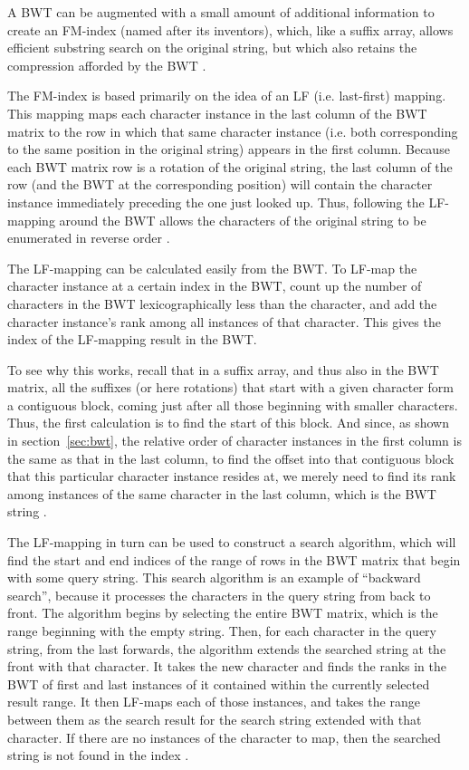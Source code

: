 \documentclass[11pt,proposal]{ucthesis}
\begin{document}

A BWT can be augmented with a small amount of additional information to create an FM-index (named after its inventors), which, like a suffix array, allows efficient substring search on the original string, but which also retains the compression afforded by the BWT \cite{ferragina2000opportunistic}.

The FM-index is based primarily on the idea of an LF (i.e. last-first) mapping. This mapping maps each character instance in the last column of the BWT matrix to the row in which that same character instance (i.e. both corresponding to the same position in the original string) appears in the first column. Because each BWT matrix row is a rotation of the original string, the last column of the row (and the BWT at the corresponding position) will contain the character instance immediately preceding the one just looked up. Thus, following the LF-mapping around the BWT allows the characters of the original string to be enumerated in reverse order \cite{ferragina2000opportunistic}.

The LF-mapping can be calculated easily from the BWT. To LF-map the character instance at a certain index in the BWT, count up the number of characters in the BWT lexicographically less than the character, and add the character instance's rank among all instances of that character. This gives the index of the LF-mapping result in the BWT.

To see why this works, recall that in a suffix array, and thus also in the BWT matrix, all the suffixes (or here rotations) that start with a given character form a contiguous block, coming just after all those beginning with smaller characters. Thus, the first calculation is to find the start of this block. And since, as shown in section~\ref{sec:bwt}, the relative order of character instances in the first column is the same as that in the last column, to find the offset into that contiguous block that this particular character instance resides at, we merely need to find its rank among instances of the same character in the last column, which is the BWT string \cite{langmead2013introduction}.

The LF-mapping in turn can be used to construct a search algorithm, which will find the start and end indices of the range of rows in the BWT matrix that begin with some query string. This search algorithm is an example of ``backward search'', because it processes the characters in the query string from back to front. The algorithm begins by selecting the entire BWT matrix, which is the range beginning with the empty string. Then, for each character in the query string, from the last forwards, the algorithm extends the searched string at the front with that character. It takes the new character and finds the ranks in the BWT of first and last instances of it contained within the currently selected result range. It then LF-maps each of those instances, and takes the range between them as the search result for the search string extended with that character. If there are no instances of the character to map, then the searched string is not found in the index \cite{ferragina2000opportunistic}.
\end{document}
